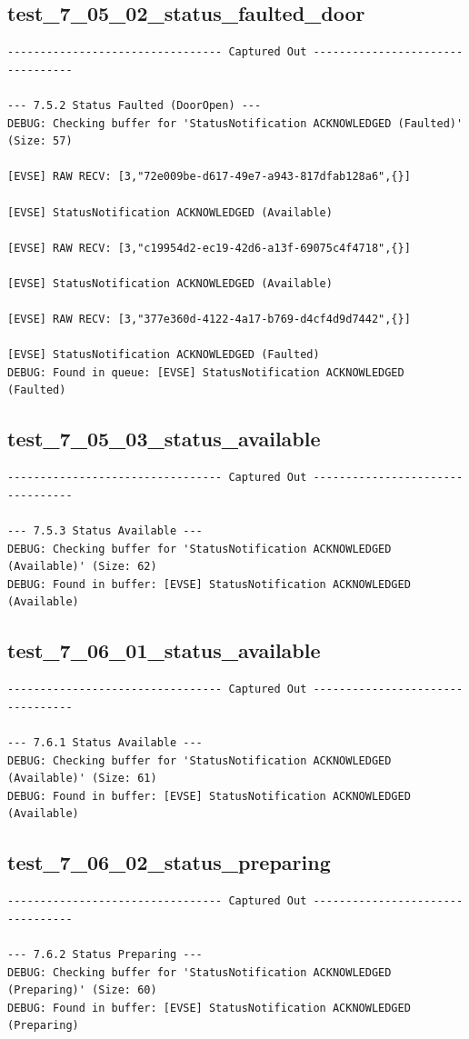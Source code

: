 \documentclass{article}
\begin{document}
\subsection*{test\_7\_05\_02\_status\_faulted\_door}
\begin{lstlisting}
--------------------------------- Captured Out ---------------------------------

--- 7.5.2 Status Faulted (DoorOpen) ---
DEBUG: Checking buffer for 'StatusNotification ACKNOWLEDGED (Faulted)' (Size: 57)

[EVSE] RAW RECV: [3,"72e009be-d617-49e7-a943-817dfab128a6",{}]

[EVSE] StatusNotification ACKNOWLEDGED (Available)

[EVSE] RAW RECV: [3,"c19954d2-ec19-42d6-a13f-69075c4f4718",{}]

[EVSE] StatusNotification ACKNOWLEDGED (Available)

[EVSE] RAW RECV: [3,"377e360d-4122-4a17-b769-d4cf4d9d7442",{}]

[EVSE] StatusNotification ACKNOWLEDGED (Faulted)
DEBUG: Found in queue: [EVSE] StatusNotification ACKNOWLEDGED (Faulted)
\end{lstlisting}
\subsection*{test\_7\_05\_03\_status\_available}
\begin{lstlisting}
--------------------------------- Captured Out ---------------------------------

--- 7.5.3 Status Available ---
DEBUG: Checking buffer for 'StatusNotification ACKNOWLEDGED (Available)' (Size: 62)
DEBUG: Found in buffer: [EVSE] StatusNotification ACKNOWLEDGED (Available)
\end{lstlisting}
\subsection*{test\_7\_06\_01\_status\_available}
\begin{lstlisting}
--------------------------------- Captured Out ---------------------------------

--- 7.6.1 Status Available ---
DEBUG: Checking buffer for 'StatusNotification ACKNOWLEDGED (Available)' (Size: 61)
DEBUG: Found in buffer: [EVSE] StatusNotification ACKNOWLEDGED (Available)
\end{lstlisting}
\subsection*{test\_7\_06\_02\_status\_preparing}
\begin{lstlisting}
--------------------------------- Captured Out ---------------------------------

--- 7.6.2 Status Preparing ---
DEBUG: Checking buffer for 'StatusNotification ACKNOWLEDGED (Preparing)' (Size: 60)
DEBUG: Found in buffer: [EVSE] StatusNotification ACKNOWLEDGED (Preparing)
\end{lstlisting}
\end{document}
